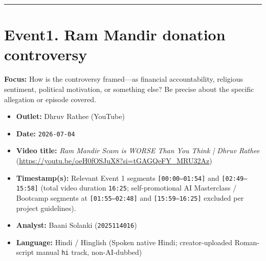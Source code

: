 \documentclass[10pt,a4paper]{article}
\begin{document}
\vspace{4pt}\noindent\rule{\textwidth}{0.4pt}\vspace{4pt}

\section*{Event1. Ram Mandir donation controversy}
\textbf{Focus:} How is the controversy framed---as financial accountability, religious sentiment, political motivation, or something else? Be precise about the specific allegation or episode covered.

\begin{itemize}[leftmargin=1.5em, itemsep=3pt, topsep=4pt]
  \item \textbf{Outlet:} Dhruv Rathee (YouTube)
  \item \textbf{Date:} \texttt{2026-07-04}
  \item \textbf{Video title:} \textit{Ram Mandir Scam is WORSE Than You Think | Dhruv Rathee} (\url{https://youtu.be/oeH0fOSJuX8?si=tGAGQeFY_MRU32Az})
  \item \textbf{Timestamp(s):} Relevant Event 1 segments \texttt{[00:00--01:54]} and \texttt{[02:49--15:58]} (total video duration \texttt{16:25}; self-promotional AI Masterclass / Bootcamp segments at \texttt{[01:55--02:48]} and \texttt{[15:59--16:25]} excluded per project guidelines).
  \item \textbf{Analyst:} Baani Solanki (\texttt{2025114016})
  \item \textbf{Language:} Hindi / Hinglish (Spoken native Hindi; creator-uploaded Roman-script manual \texttt{hi} track, non-AI-dubbed)
\end{itemize}
\end{document}

